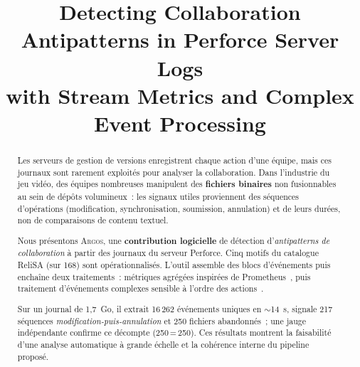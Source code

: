 \documentclass[conference]{IEEEtran}
\newcommand{\toolname}{\textsc{Argos}}
\begin{document}
\title{Detecting Collaboration Antipatterns in Perforce Server Logs\\
with Stream Metrics and Complex Event Processing}

\author{%
\and
{}
\and
{}
}

\maketitle

\begin{abstract}
Les serveurs de gestion de versions enregistrent chaque action d'une
équipe, mais ces journaux sont rarement exploités pour analyser la
collaboration. Dans l'industrie du jeu vidéo, des équipes nombreuses
manipulent des \textbf{fichiers binaires} non fusionnables au sein de
dépôts volumineux~: les signaux utiles proviennent des séquences
d'opérations (modification, synchronisation, soumission, annulation) et
de leurs durées, non de comparaisons de contenu textuel.

Nous présentons \toolname{}, une \textbf{contribution logicielle} de
détection d'\emph{antipatterns de collaboration} à partir des journaux du
serveur Perforce. Cinq motifs du catalogue ReliSA (sur 168) sont
opérationnalisés. L'outil assemble des blocs d'événements puis enchaîne
deux traitements~: métriques agrégées inspirées de
Prometheus~\cite{brazil2018prometheus,prometheus_metric_types}, puis
traitement d'événements complexes sensible à l'ordre des
actions~\cite{halle2018beepbeep,luckham2002power}.

Sur un journal de 1,7~Go, il extrait 16\,262 événements uniques en
${\sim}$14~s, signale 217 séquences \emph{modification-puis-annulation}
et 250 fichiers abandonnés~; une jauge indépendante confirme ce
décompte (250\,=\,250). Ces résultats montrent la faisabilité d'une
analyse automatique à grande échelle et la cohérence interne du
pipeline proposé.
\end{abstract}
\end{document}
